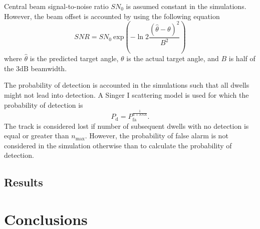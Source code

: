 \documentclass[english, 12pt, a4paper, elec, utf8, a-1b, online]{aaltothesis}
\renewcommand{\exp}[1]{\text{exp}\left( #1 \right)}
\begin{document}
Central beam signal-to-noise ratio $SN_0$ is assumed constant in the simulations. 
However, the beam offset is accounted by using the following equation
\begin{equation} \label{eq:snr}
    SNR = SN_0~\exp{ - \ln{2}
        \frac
            {(\hat{\theta} - \theta)^2}
            {B^2}}    
\end{equation}
where $\hat{\theta}$ is the predicted target angle, $\theta$ is the actual target angle, and $B$ is half of the $3\text{dB}$ beamwidth. 

The probability of detection is accounted in the simulations such that all dwells might not lead into detection.
A Singer I scattering model is used for which the probability of detection is
\begin{equation}
    P_\text{d} = P_\text{fa}^{\frac{1}{1+SNR}}.
\end{equation}
The track is considered lost if number of subsequent dwells with no detection is equal or greater than $n_{\max}$.
However, the probability of false alarm is not considered in the simulation otherwise than to calculate the probability of detection.


\subsection{Results}


\newpage
\section{Conclusions}


\thesisbibliography

\printbibliography
\end{document}
